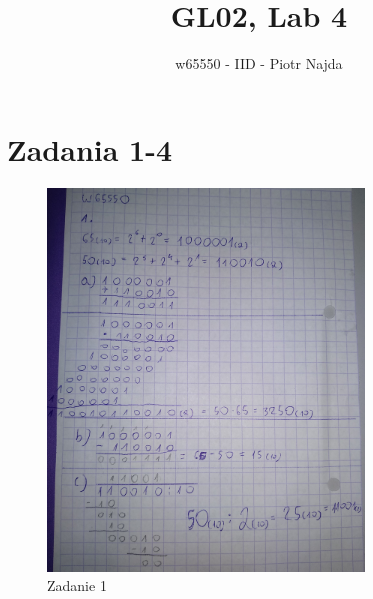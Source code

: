\documentclass[12pt,a4paper]{article}
\title{GL02, Lab 4}
\author{w65550 - IID - Piotr Najda}
\begin{document}
\maketitle

\section{Zadania 1-4}

\begin{figure}[ht]
\centering
\includegraphics[width=0.75\textwidth]{IMG_20211116_090018.jpg}
\caption{\label{fig:zad1do3}Zadanie 1}
\end{figure}
\end{document}
